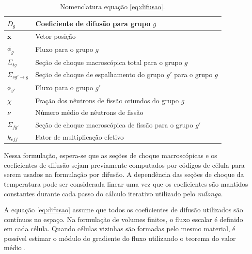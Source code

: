 \begin{table}[htb]
\centering
\caption[Nomenclatura equação de difusão de nêutrons.]{Nomenclatura equação \ref{eq:difusao}.}
\label{tab:eq-dif}
\begin{tabular}{ll}
 $D_g$                       & Coeficiente de difusão para grupo $g$                        \\ \hline
 $\mathbf{x}$                & Vetor posição                                              \\ \hline
 $\phi_g$                    & Fluxo para o grupo $g$                                       \\ \hline
  $\Sigma_{tg}$              & Seção de choque macroscópica total para o grupo $g$          \\ \hline
  $\Sigma_{sg'\rightarrow g}$  & Seção de choque de espalhamento do grupo $g'$ para o grupo $g$ \\ \hline
 $\phi_{g'}$                         & Fluxo para o grupo $g'$                                      \\ \hline
 $\chi$                     & Fração dos nêutrons de fissão oriundos do grupo $g$           \\ \hline
 $\nu$                      & Número médio de nêutrons de fissão                         \\ \hline
  $\Sigma_{fg'}$             & Seção de choque macroscópica de fissão para o grupo $g'$     \\ \hline
 $k_{eff}$                   & Fator de multiplicação efetivo                            
\end{tabular}
\end{table}
Nessa formulação, espera-se que as seções de choque macroscópicas e os coeficientes de difusão sejam
previamente computados por códigos de célula para serem usados na formulação por difusão.
A dependência das seções de choque da temperatura pode ser considerada linear uma vez que
os coeficientes são mantidos constantes durante cada passo do cálculo iterativo utilizado
pelo \textit{milonga}.

A equação \ref{eq:difusao} assume que todos os coeficientes de difusão utilizados são
contínuos no espaço. Na formulação de volumes finitos,
o fluxo escalar é definido em cada célula. Quando células vizinhas são formadas
pelo mesmo material, é possível estimar o módulo do gradiente do fluxo
utilizando o teorema do valor médio \cite{Theler2013b}.

